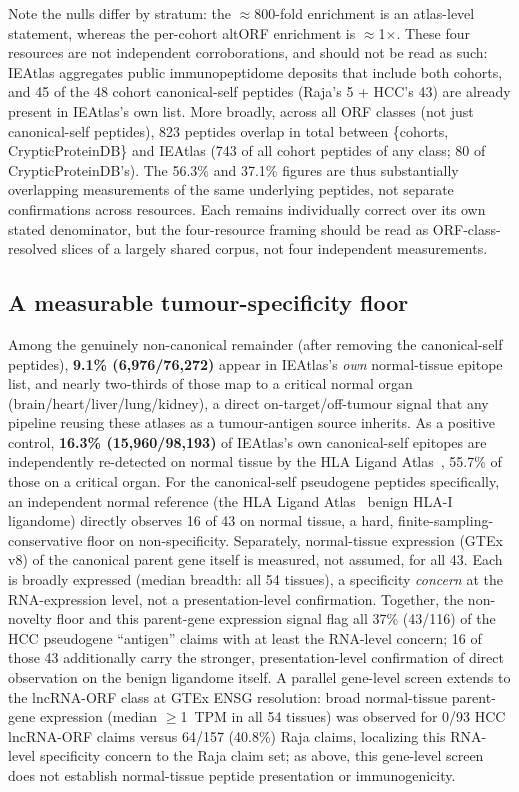 Note the nulls differ by stratum: the $\approx$800-fold enrichment is an atlas-level statement, whereas the per-cohort altORF enrichment is $\approx$1$\times$. These four resources are not independent corroborations, and should not be read as such: IEAtlas aggregates public immunopeptidome deposits that include both cohorts, and 45 of the 48 cohort canonical-self peptides (Raja's 5 + HCC's 43) are already present in IEAtlas's own list. More broadly, across all ORF classes (not just canonical-self peptides), 823 peptides overlap in total between \{cohorts, CrypticProteinDB\} and IEAtlas (743 of all cohort peptides of any class; 80 of CrypticProteinDB's). The 56.3\% and 37.1\% figures are thus substantially overlapping measurements of the same underlying peptides, not separate confirmations across resources. Each remains individually correct over its own stated denominator, but the four-resource framing should be read as ORF-class-resolved slices of a largely shared corpus, not four independent measurements.

\subsection{A measurable tumour-specificity floor}
Among the genuinely non-canonical remainder (after removing the canonical-self peptides), \textbf{9.1\% (6{,}976/76{,}272)} appear in IEAtlas's \emph{own} normal-tissue epitope list, and nearly two-thirds of those map to a critical normal organ (brain/heart/liver/lung/kidney), a direct on-target/off-tumour signal that any pipeline reusing these atlases as a tumour-antigen source inherits. As a positive control, \textbf{16.3\% (15{,}960/98{,}193)} of IEAtlas's own canonical-self epitopes are independently re-detected on normal tissue by the HLA Ligand Atlas~\cite{r12}, 55.7\% of those on a critical organ. For the canonical-self pseudogene peptides specifically, an independent normal reference (the HLA Ligand Atlas~\cite{r12} benign HLA-I ligandome) directly observes 16 of 43 on normal tissue, a hard, finite-sampling-conservative floor on non-specificity. Separately, normal-tissue expression (GTEx v8) of the canonical parent gene itself is measured, not assumed, for all 43. Each is broadly expressed (median breadth: all 54 tissues), a specificity \emph{concern} at the RNA-expression level, not a presentation-level confirmation. Together, the non-novelty floor and this parent-gene expression signal flag all 37\% (43/116) of the HCC pseudogene ``antigen'' claims with at least the RNA-level concern; 16 of those 43 additionally carry the stronger, presentation-level confirmation of direct observation on the benign ligandome itself. A parallel gene-level screen extends to the lncRNA-ORF class at GTEx ENSG resolution: broad normal-tissue parent-gene expression (median $\ge$1~TPM in all 54 tissues) was observed for 0/93 HCC lncRNA-ORF claims versus 64/157 (40.8\%) Raja claims, localizing this RNA-level specificity concern to the Raja claim set; as above, this gene-level screen does not establish normal-tissue peptide presentation or immunogenicity.

